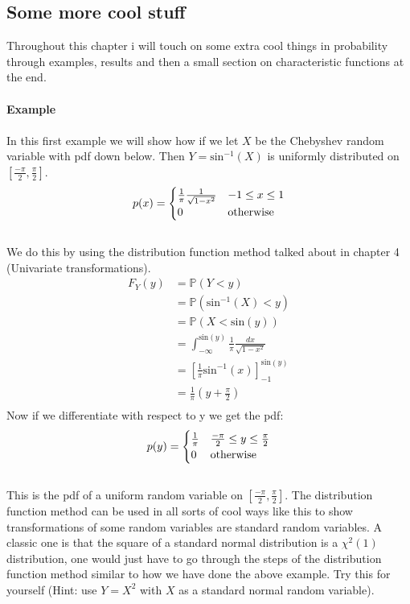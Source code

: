 \documentclass[,oneside]{article}
\begin{document}
\begin{enumerate}
\section{Some more cool stuff}
Throughout this chapter i will touch on some extra cool things in probability through examples, results and then a small section on characteristic functions at the end.\\ \\ 
\textbf{Example}\\ \\
In this first example we will show how if we let $X$ be the Chebyshev random variable with pdf down below. Then $Y = \text{sin}^{-1}(X)$ is uniformly distributed on $[\frac{-\pi}{2},\frac{\pi}{2}]$.
\[
p(x)=
\begin{cases}
\frac{1}{\pi} \frac{1}{\sqrt{1-x^2}} &  -1 \leq x \leq 1\\
0 & $otherwise$
\end{cases} \] \\
We do this by using the distribution function method talked about in chapter 4 (Univariate transformations).
\begin{align*}
F_Y(y) &= \mathbb{P} (Y < y)\\
&= \mathbb{P}(\text{sin}^{-1}(X) < y)\\
&= \mathbb{P}(X < \text{sin}(y))\\
&= \int_{-\infty}^{\text{sin}(y)}\frac{1}{\pi} \frac{dx}{\sqrt{1-x^2}}\\
&= \left [ \frac{1}{\pi} \text{sin}^{-1}(x) \right ]_{-1}^{\text{sin}(y)}\\
&= \frac{1}{\pi} \left (y+\frac{\pi}{2} \right )\\
\end{align*}
Now if we differentiate with respect to y we get the pdf:
\[
p(y)=
\begin{cases}
\frac{1}{\pi} &  \frac{-\pi}{2} \leq y \leq  \frac{\pi}{2}\\
0 & $otherwise$
\end{cases} \] \\
This is the pdf of a uniform random variable on $[\frac{-\pi}{2},\frac{\pi}{2}]$. The distribution function method can be used in all sorts of cool ways like this to show transformations of some random variables are standard random variables. A classic one is that the square of a standard normal distribution is a $\chi^2(1)$ distribution, one would just have to go through the steps of the distribution function method similar to how we have done the above example. Try this for yourself (Hint: use $Y = X^2$ with $X$ as a standard normal random variable). \\ \\

\end{enumerate}
\end{document}
